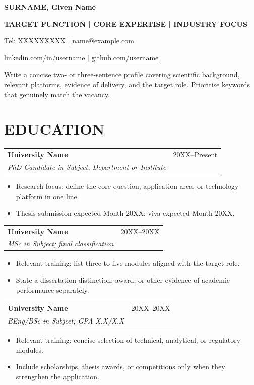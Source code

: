 \documentclass[a4paper,11pt]{article}
\makeatletter
\newcommand{\cvheading}[4]{%
  \par\addvspace{5pt}\noindent\begin{tabularx}{\linewidth}{@{}>{\raggedright\arraybackslash}Xr@{}}
    \textbf{#1} & \color{muted}\small #2 \\
    \textit{#3} & \color{muted}\small #4
  \end{tabularx}\par\vspace{-1pt}}
\newcommand{\cvheadingfirst}[4]{%
  \par\noindent\begin{tabularx}{\linewidth}{@{}>{\raggedright\arraybackslash}Xr@{}}
    \textbf{#1} & \color{muted}\small #2 \\
    \textit{#3} & \color{muted}\small #4
  \end{tabularx}\par\vspace{-1pt}}
\newenvironment{cvitems}{%
  \begin{itemize}[leftmargin=4.6mm,label=\raisebox{0.25ex}{\tiny$\bullet$},itemsep=2pt,topsep=2.2pt,parsep=0pt,partopsep=0pt]\justifying
}{\end{itemize}\vspace{1.5pt}}
\makeatother
\begin{document}
{\fontsize{27}{30}\selectfont\bfseries SURNAME, Given Name}\par
\vspace{8pt}
{\color{accent}\bfseries\fontsize{12}{15}\selectfont TARGET FUNCTION \enspace | \enspace CORE EXPERTISE \enspace | \enspace INDUSTRY FOCUS}\par
\vspace{5pt}
{\small Tel: XXXXXXXXX \enspace | \enspace
\href{mailto:name@example.com}{name@example.com}\par
\href{https://www.linkedin.com/in/username}{linkedin.com/in/username} \enspace | \enspace
\href{https://github.com/username}{github.com/username}}
\par\vspace{9pt}
\justifying Write a concise two- or three-sentence profile covering scientific background, relevant platforms, evidence of delivery, and the target role. Prioritise keywords that genuinely match the vacancy.

\section{EDUCATION}
\cvheadingfirst{University Name}{20XX--Present}{PhD Candidate in Subject, Department or Institute}{ }
\begin{cvitems}
  \item Research focus: define the core question, application area, or technology platform in one line.
  \item Thesis submission expected Month 20XX; viva expected Month 20XX.
\end{cvitems}
\cvheading{University Name}{20XX--20XX}{MSc in Subject; final classification}{ }
\begin{cvitems}
  \item Relevant training: list three to five modules aligned with the target role.
  \item State a dissertation distinction, award, or other evidence of academic performance separately.
\end{cvitems}
\cvheading{University Name}{20XX--20XX}{BEng/BSc in Subject; GPA X.X/X.X}{ }
\begin{cvitems}
  \item Relevant training: concise selection of technical, analytical, or regulatory modules.
  \item Include scholarships, thesis awards, or competitions only when they strengthen the application.
\end{cvitems}
\end{document}
